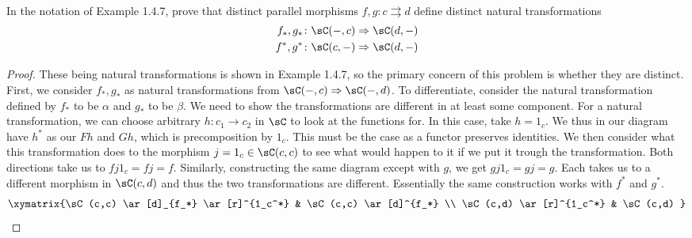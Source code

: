 \documentclass[../../main]{subfiles}
\begin{document}
\paragraph{}
\begin{exercise}
	In the notation of Example 1.4.7, prove that distinct parallel morphisms
	$f,g\colon c\rightrightarrows d$ define distinct natural transformations
	\begin{align*}
		f_*,g_*\colon \sC(-,c) \Rightarrow \sC(d,-) \\
		f^*,g^*\colon \sC(c,-) \Rightarrow \sC(d,-)
	\end{align*}
\end{exercise}

\begin{proof}
	These being natural transformations is shown in Example 1.4.7, so the
	primary concern of this problem is whether they are distinct.  First, we
	consider $f_*,g_*$ as natural transformations from $\sC(-,c) \Rightarrow
	\sC(-,d)$.  To differentiate, consider the natural transformation defined by
	$f_*$ to be $\alpha$ and $g_*$ to be $\beta$.  We need to show the
	transformations are different in at least some component.  For a natural
	transformation, we can choose arbitrary $h\colon c_1 \rightarrow c_2$ in $\sC$ to
	look at the functions for.  In this case, take $h = 1_c$.  We thus in our
	diagram have $h^*$ as our $Fh$ and $Gh$, which is precomposition by $1_c$.
	This must be the case as a functor preserves identities.  We then consider
	what this transformation does to the morphism $j =1_c \in \sC(c,c)$ to see
	what would happen to it if we put it trough the transformation.  Both
	directions take us to $fj1_c = fj = f$.  Similarly, constructing the same
	diagram except with $g$, we get $gj1_c = gj = g$.  Each takes us to a
	different morphism in $\sC(c,d)$ and thus the two transformations are
	different.  Essentially the same construction works with $f^*$ and $g^*$.
	\begin{equation*}
		\xymatrix{\sC(c,c) \ar[d]_{f_*} \ar[r]^{1_c^*} & \sC(c,c) \ar[d]^{f_*} \\
		\sC(c,d) \ar[r]^{1_c^*} & \sC(c,d) }
	\end{equation*}
\end{proof}
\end{document}
